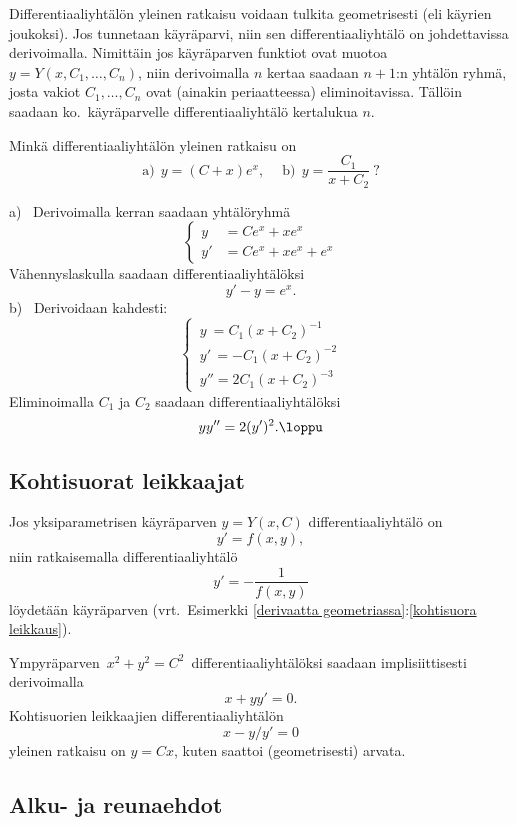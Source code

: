Differentiaaliyhtälön yleinen ratkaisu voidaan tulkita geometrisesti  
(eli käyrien joukoksi). Jos tunnetaan käyräparvi, niin sen differentiaaliyhtälö on 
johdettavissa derivoimalla. Nimittäin jos käyräparven funktiot ovat muotoa 
$y=Y(x,C_1,\ldots,C_n)$, niin derivoimalla $n$ kertaa saadaan $n+1$:n yhtälön ryhmä, josta 
vakiot $C_1,\ldots,C_n$ ovat (ainakin periaatteessa) eliminoitavissa. Tällöin saadaan ko.\ 
käyräparvelle differentiaaliyhtälö kertalukua $n$.
\begin{Exa}
Minkä differentiaaliyhtälön yleinen ratkaisu on 
\[ 
\text{a)}\ \ y=(C+x)e^x, \quad\ \text{b)}\ \ y=\frac{C_1}{x+C_2}\ ? 
\]
\end{Exa}
\ratk a) \ Derivoimalla kerran saadaan yhtälöryhmä
\[
\left\{
\begin{aligned}
y &=Ce^x+xe^x \\
y'&=Ce^x+xe^x+e^x
\end{aligned}
\right.
\]
Vähennyslaskulla saadaan differentiaaliyhtälöksi
\[
y'-y=e^x.
\]
b) \ Derivoidaan kahdesti:
\[
\begin{cases}
\,y\  =C_1(x+C_2)^{-1} \\
\,y'\,=-C_1(x+C_2)^{-2} \\
\,y'' =2C_1(x+C_2)^{-3}
\end{cases}
\]
Eliminoimalla $C_1$ ja $C_2$ saadaan differentiaaliyhtälöksi
\[
yy''=2(y')^2. \loppu
\]

\subsection{Kohtisuorat leikkaajat}

Jos yksiparametrisen käyräparven $y=Y(x,C)$ differentiaaliyhtälö on 
\[ 
y'=f(x,y), 
\] 
niin ratkaisemalla differentiaaliyhtälö
\[ 
y'=-\frac{1}{f(x,y)} 
\]
löydetään käyräparven 
(vrt.\ Esimerkki \ref{derivaatta geometriassa}:\ref{kohtisuora leikkaus}).
\begin{Exa}
Ympyräparven $\,x^2+y^2=C^2\,$ differentiaaliyhtälöksi saadaan implisiittisesti derivoimalla
\[
x+yy'=0.
\]
Kohtisuorien leikkaajien differentiaaliyhtälön
\[
x-y/y'=0
\]
yleinen ratkaisu on $y=Cx$, kuten saattoi (geometrisesti) arvata. \loppu
\end{Exa}

\subsection{Alku- ja reunaehdot}

